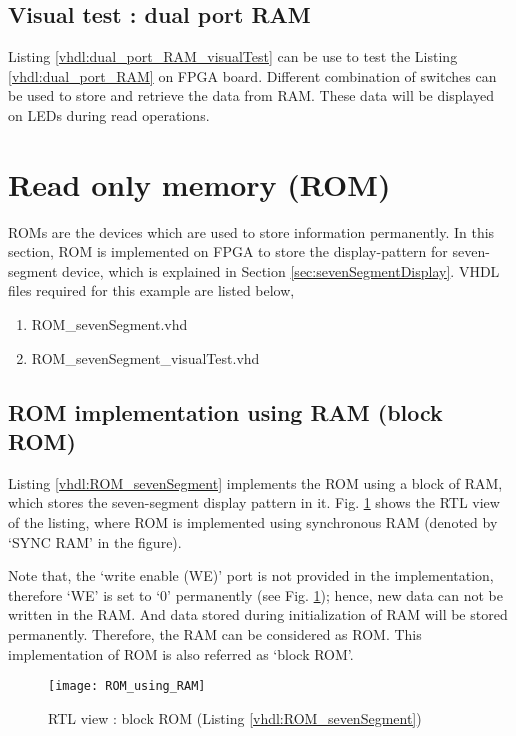 

\subsection{Visual test : dual port RAM}
Listing \ref{vhdl:dual_port_RAM_visualTest} can be use to test the Listing \ref{vhdl:dual_port_RAM} on FPGA board. Different combination of switches can be used to store and retrieve the data from RAM. These data will be displayed on LEDs during read operations. 


\section{Read only memory (ROM)}
ROMs are the devices which are used to store information permanently. In this section, ROM is implemented on FPGA to store the display-pattern for seven-segment device, which is explained in Section \ref{sec:sevenSegmentDisplay}. VHDL files required for this example are listed below, 
\begin{enumerate}
	\item ROM\_sevenSegment.vhd
	\item ROM\_sevenSegment\_visualTest.vhd
\end{enumerate}

\subsection{ROM implementation using RAM (block ROM)} \label{sec:ROMusingRAM}
Listing \ref{vhdl:ROM_sevenSegment} implements the ROM using a block of RAM, which stores the seven-segment display pattern in it. Fig. \ref{fig:ROM_using_RAM} shows the RTL view of the listing, where ROM is implemented using synchronous RAM (denoted by `SYNC RAM' in the figure). 

Note that, the `write enable (WE)' port is not provided in the implementation, therefore `WE' is set to `0' permanently (see Fig. \ref{fig:ROM_using_RAM}); hence, new data can not be written in the RAM. And data stored during initialization of RAM will be stored permanently. Therefore, the RAM can be considered as ROM. This implementation of ROM is also referred as `block ROM'. 

\begin{figure}[!h]
	\centering
	\texttt{[image: ROM\_using\_RAM]}
	\caption{RTL view : block ROM (Listing \ref{vhdl:ROM_sevenSegment})}
	\label{fig:ROM_using_RAM}
\end{figure}

